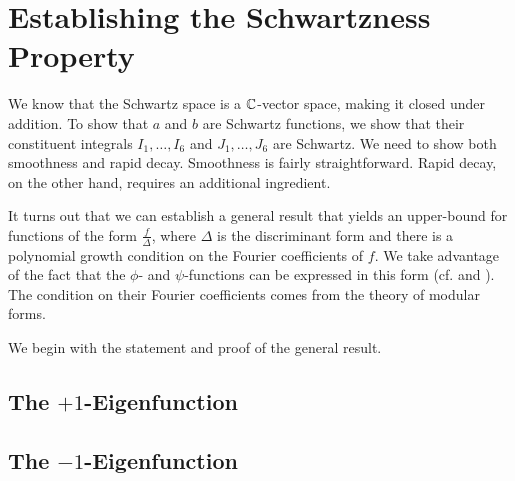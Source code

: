 \section{Establishing the Schwartzness Property}

We know that the Schwartz space is a $\mathbb{C}$-vector space, making it closed under addition. To show that $a$ and $b$ are Schwartz functions, we show that their constituent integrals $I_1, \ldots, I_6$ and $J_1, \ldots, J_6$ are Schwartz. We need to show both smoothness and rapid decay. Smoothness is fairly straightforward. Rapid decay, on the other hand, requires an additional ingredient.

It turns out that we can establish a general result that yields an upper-bound for functions of the form $\frac{f}{\Delta}$, where $\Delta$ is the discriminant form and there is a polynomial growth condition on the Fourier coefficients of $f$. We take advantage of the fact that the $\phi$- and $\psi$-functions can be expressed in this form (cf.  and ). The condition on their Fourier coefficients comes from the theory of modular forms.

We begin with the statement and proof of the general result.

\begin{boxtheorem}
    
\end{boxtheorem}

\subsection{The $+1$-Eigenfunction}

\subsection{The $-1$-Eigenfunction}